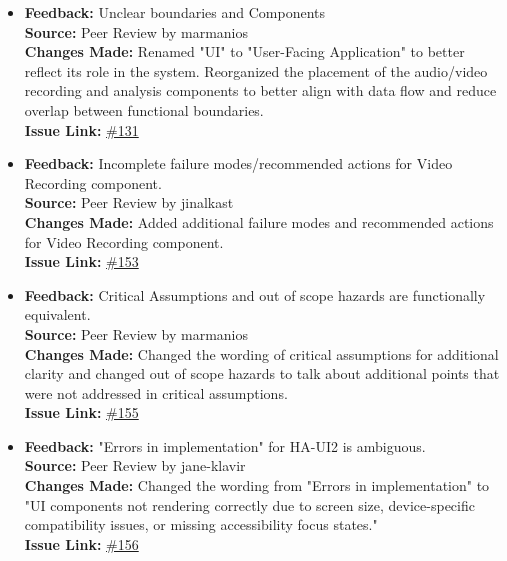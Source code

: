 \documentclass{article}
\begin{document}
\begin{itemize}
      \item 
      \textbf{Feedback:} Unclear boundaries and Components\\
      \textbf{Source:} Peer Review by marmanios \\
      \textbf{Changes Made:} Renamed "UI" to "User-Facing Application" to better reflect its role in the system. Reorganized the placement of the audio/video recording and analysis components to better align with data flow and reduce overlap between functional boundaries. \\
      \textbf{Issue Link:} \href{https://github.com/parishanizam/TeleHealth/issues/131}{\#131}

      \item 
      \textbf{Feedback:} Incomplete failure modes/recommended actions for Video Recording component. \\
      \textbf{Source:} Peer Review by jinalkast \\
      \textbf{Changes Made:} Added additional failure modes and recommended actions for Video Recording component. \\
      \textbf{Issue Link:} \href{https://github.com/parishanizam/TeleHealth/issues/153}{\#153}

      \item 
      \textbf{Feedback:} Critical Assumptions and out of scope hazards are functionally equivalent. \\
      \textbf{Source:} Peer Review by marmanios \\
      \textbf{Changes Made:} Changed the wording of critical assumptions for additional clarity and changed out of scope hazards to talk about additional points that were not addressed in critical assumptions. \\
      \textbf{Issue Link:} \href{https://github.com/parishanizam/TeleHealth/issues/155}{\#155}

      \item 
      \textbf{Feedback:} "Errors in implementation" for HA-UI2 is ambiguous. \\
      \textbf{Source:} Peer Review by jane-klavir \\
      \textbf{Changes Made:} Changed the wording from "Errors in implementation" to "UI components not rendering correctly due to screen size, device-specific compatibility issues, or missing accessibility focus states." \\
      \textbf{Issue Link:} \href{https://github.com/parishanizam/TeleHealth/issues/156}{\#156}


\end{itemize}
\end{document}
